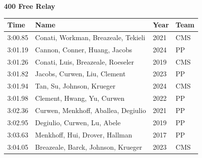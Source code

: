 \vspace{1.2em}
\noindent\begin{minipage}[t]{0.98\textwidth}
\centering
\textbf{\textcolor{teamprimary}{400 Free Relay}}\par
\vspace{0.5em}
\centering
\small
\renewcommand{\arraystretch}{1.0}
\setlength{\tabcolsep}{4pt}
\begin{tabular}{@{}p{2.7cm}p{4.3cm}p{1.6cm}p{2.7cm}@{}}
\toprule
\textbf{Time} & \textbf{Name} & \textbf{Year} & \textbf{Team} \\
\midrule
3:00.85 & Conati, Workman, Breazeale, Tekieli & 2021 & CMS \\
3:01.19 & Cannon, Conner, Huang, Jacobs & 2024 & PP \\
3:01.26 & Conati, Luis, Breazeale, Roeseler & 2019 & CMS \\
3:01.82 & Jacobs, Curwen, Liu, Clement & 2023 & PP \\
3:01.94 & Tan, Su, Johnson, Krueger & 2024 & CMS \\
3:01.98 & Clement, Hwang, Yu, Curwen & 2022 & PP \\
3:02.36 & Curwen, Menkhoff, Aballea, Degiulio & 2021 & PP \\
3:02.95 & Degiulio, Curwen, Lu, Abele & 2019 & PP \\
3:03.63 & Menkhoff, Hui, Drover, Hallman & 2017 & PP \\
3:04.05 & Breazeale, Barck, Johnson, Krueger & 2023 & CMS \\
\bottomrule
\end{tabular}
\end{minipage}
\vspace{1.2em}
